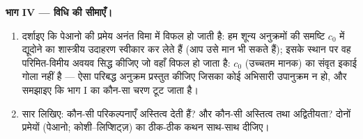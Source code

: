 \begin{problem}[{सप्ताहांत समस्या --- लिप्शिट्ज़ के बिना $x' = f(t, x)$ के
हलों का अस्तित्व}]
\medskip
\noindent\textbf{भाग IV --- विधि की सीमाएँ।}
\begin{enumerate}[resume]
  \item दर्शाइए कि पेआनो की प्रमेय अनंत विमा में विफल हो जाती
        है: हम शून्य अनुक्रमों की समष्टि $c_0$ में द्यूदोने का
        शास्त्रीय उदाहरण स्वीकार कर लेते हैं (आप उसे मान भी सकते
        हैं); इसके स्थान पर वह परिमित-विमीय अवयव सिद्ध कीजिए जो
        वहाँ विफल हो जाता है: $c_0$ (उच्चतम मानक) का संवृत इकाई
        गोला  नहीं है --- ऐसा परिबद्ध अनुक्रम प्रस्तुत कीजिए
        जिसका कोई अभिसारी उपानुक्रम न हो, और समझाइए कि भाग I का
        कौन-सा चरण टूट जाता है।
  \item सार लिखिए: कौन-सी परिकल्पनाएँ अस्तित्व देती हैं? और
        कौन-सी अस्तित्व तथा अद्वितीयता? दोनों प्रमेयों (पेआनो;
        कोशी--लिप्शिट्ज़) का ठीक-ठीक कथन साथ-साथ दीजिए।
\end{enumerate}


\end{problem}
